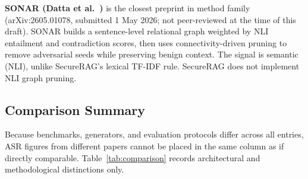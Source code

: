 \documentclass[journal]{IEEEtran}
\begin{document}
\textbf{SONAR (Datta et al.~\cite{datta2026sonar})} is the closest preprint in
method family (arXiv:2605.01078, submitted 1 May 2026; not peer-reviewed at the
time of this draft). SONAR builds a sentence-level relational graph weighted by
NLI entailment and contradiction scores, then uses connectivity-driven pruning to
remove adversarial seeds while preserving benign context. The signal is semantic
(NLI), unlike SecureRAG's lexical TF-IDF rule. SecureRAG does not implement NLI
graph pruning.

\subsection{Comparison Summary}

Because benchmarks, generators, and evaluation protocols differ across all
entries, ASR figures from different papers cannot be placed in the same column as
if directly comparable. Table~\ref{tab:comparison} records architectural and
methodological distinctions only.
\end{document}
